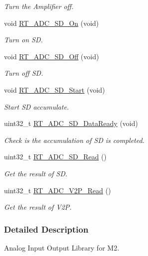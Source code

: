 \begin{DoxyCompactItemize}
\begin{DoxyCompactList}\small\item\em Turn the Amplifier off. \end{DoxyCompactList}\item 
void \mbox{\hyperlink{a00002_a3bb0bbb7c349af23c8e5f1b0d8408a07}{R\+T\+\_\+\+A\+D\+C\+\_\+\+S\+D\+\_\+\+On}} (void)
\begin{DoxyCompactList}\small\item\em Turn on SD. \end{DoxyCompactList}\item 
void \mbox{\hyperlink{a00002_a1934526cb3d40a1b0ae7a0f19597a4ff}{R\+T\+\_\+\+A\+D\+C\+\_\+\+S\+D\+\_\+\+Off}} (void)
\begin{DoxyCompactList}\small\item\em Turn off SD. \end{DoxyCompactList}\item 
void \mbox{\hyperlink{a00002_ac75cab97ce7cce47671dd8ef34e920d8}{R\+T\+\_\+\+A\+D\+C\+\_\+\+S\+D\+\_\+\+Start}} (void)
\begin{DoxyCompactList}\small\item\em Start SD accumulate. \end{DoxyCompactList}\item 
uint32\+\_\+t \mbox{\hyperlink{a00002_a7fd97b414a33170e6013c88f37e028a9}{R\+T\+\_\+\+A\+D\+C\+\_\+\+S\+D\+\_\+\+Data\+Ready}} (void)
\begin{DoxyCompactList}\small\item\em Check is the accumulation of SD is completed. \end{DoxyCompactList}\item 
uint32\+\_\+t \mbox{\hyperlink{a00002_a5532ac461de55576a3875b29300c8536}{R\+T\+\_\+\+A\+D\+C\+\_\+\+S\+D\+\_\+\+Read}} ()
\begin{DoxyCompactList}\small\item\em Get the result of SD. \end{DoxyCompactList}\item 
uint32\+\_\+t \mbox{\hyperlink{a00002_aeb7d0cb0a7849fc5736dae01fe607910}{R\+T\+\_\+\+A\+D\+C\+\_\+\+V2\+P\+\_\+\+Read}} ()
\begin{DoxyCompactList}\small\item\em Get the result of V2P. \end{DoxyCompactList}\end{DoxyCompactItemize}


\subsubsection{Detailed Description}
Analog Input Output Library for M2. 

